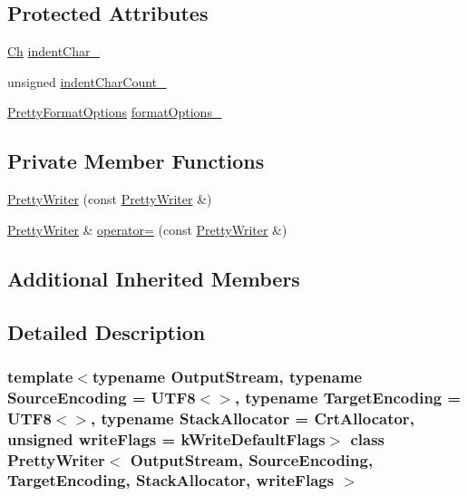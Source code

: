 \subsection*{Protected Attributes}
\begin{DoxyCompactItemize}
\item 
\hyperlink{classPrettyWriter_ae35c89bda4c5d59d3ff6efcf2fea45a3}{Ch} \hyperlink{classPrettyWriter_aaa3f6380daa8466a5101ed18fc33bf04}{indent\+Char\+\_\+}
\item 
unsigned \hyperlink{classPrettyWriter_a7d00b9716ef3cd7e34ae1b744c968f13}{indent\+Char\+Count\+\_\+}
\item 
\hyperlink{prettywriter_8h_a150fd6ef2dbf4025c33ece85451982d5}{Pretty\+Format\+Options} \hyperlink{classPrettyWriter_a15505ed4ea0fa85d339b3a987f1a3aaf}{format\+Options\+\_\+}
\end{DoxyCompactItemize}
\subsection*{Private Member Functions}
\begin{DoxyCompactItemize}
\item 
\hyperlink{classPrettyWriter_af573bc27031d90fbc03aab668b099faa}{Pretty\+Writer} (const \hyperlink{classPrettyWriter}{Pretty\+Writer} \&)
\item 
\hyperlink{classPrettyWriter}{Pretty\+Writer} \& \hyperlink{classPrettyWriter_acf82b0bb61c1fab002d84a458674ff03}{operator=} (const \hyperlink{classPrettyWriter}{Pretty\+Writer} \&)
\end{DoxyCompactItemize}
\subsection*{Additional Inherited Members}


\subsection{Detailed Description}
\subsubsection*{template$<$typename Output\+Stream, typename Source\+Encoding = U\+T\+F8$<$$>$, typename Target\+Encoding = U\+T\+F8$<$$>$, typename Stack\+Allocator = Crt\+Allocator, unsigned write\+Flags = k\+Write\+Default\+Flags$>$\newline
class Pretty\+Writer$<$ Output\+Stream, Source\+Encoding, Target\+Encoding, Stack\+Allocator, write\+Flags $>$}

